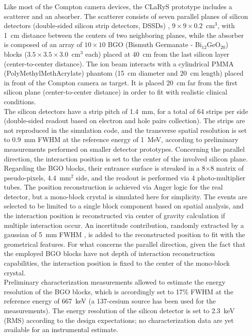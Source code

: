 Like most of the Compton camera devices, the CLaRyS prototype includes a scatterer and an absorber. The scatterer consists of seven parallel planes of silicon detectors (double-sided silicon strip detectors, DSSDs) , $9\times9\times0.2$~cm$^3$, with 1~cm distance between the centers of two neighboring planes, while the absorber is composed of an array of $10\times10$ BGO (Bismuth Germanate - Bi$_12$GeO$_20$) blocks ($3.5\times3.5\times3.0$~cm$^3$ each) placed at 40~cm from the last silicon layer (center-to-center distance). The ion beam interacts with a cylindrical PMMA (PolyMethylMethAcrylate) phantom (15~cm diameter and 20~cm length) placed in front of the Compton camera as target. It is placed 20~cm far from the first silicon plane (center-to-center distance) in order to fit with realistic clinical conditions.\\
The silicon detectors have a strip pitch of 1.4~mm, for a total of 64 strips per side (double-sided readout based on electron and hole pairs collection). The strips are not reproduced in the simulation code, and the transverse spatial resolution is set to 0.9~mm FWHM at the reference energy of 1~MeV, according to preliminary measurements performed on smaller detector prototypes. Concerning the parallel direction, the interaction position is set to the center of the involved silicon plane.\\
Regarding the BGO blocks, their entrance surface is streaked in a 8$\times$8 matrix of pseudo-pixels, 4.4~mm$^{2}$ side, and the readout is performed via 4 photo-multiplier tubes. The position reconstruction is achieved via Anger logic for the real detector, but a mono-block crystal is simulated here for simplicity. The events are selected to be limited to a single block component based on spatial analysis, and the interaction position is reconstructed via center of gravity calculation if multiple interaction occur. An incertitude contribution, randomly extracted by a gaussian of 5~mm FWHM , is added to the reconstructed position to fit with the geometrical features. For what concerns the parallel direction, given the fact that the employed BGO blocks have not depth of interaction reconstruction capabilities, the interaction position is fixed to the center of the mono-block crystal.\\
Preliminary characterization measurements allowed to estimate the energy resolution of the BGO blocks, which is accordingly set to 17\% FWHM at the reference energy of 667~keV (a 137-cesium source has been used for the measurements). The energy resolution of the silicon detector is set to 2.3~keV (RMS) according to the design expectations; no characterization data are yet available for an instrumental estimate.\\
